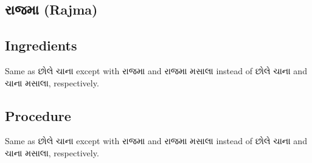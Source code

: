 \documentclass[../../recipes.tex]{subfiles}
\begin{document}
\begin{gujarati}

\chapter{રાજમા (Rajma)}

\section*{Ingredients}

Same as છોલે ચાના except with રાજમા and રાજમા મસાલા instead of છોલે ચાના and ચાના મસાલા, respectively.

\noindent
\section*{Procedure}

Same as છોલે ચાના except with રાજમા and રાજમા મસાલા instead of છોલે ચાના and ચાના મસાલા, respectively.

\end{gujarati}
\end{document}
